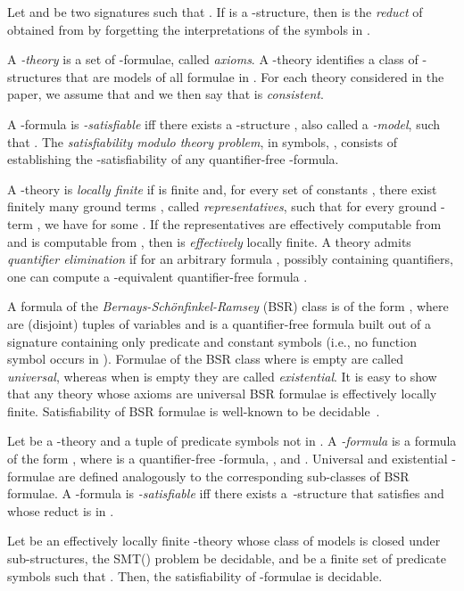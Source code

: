 \documentclass[conference]{llncs}
\begin{document}
{Let  and  be two
signatures such that . If  is a
-structure, then  is the \emph{reduct}
of  obtained from  by forgetting the
interpretations of the symbols in .

A \emph{-theory}  is a set of -formulae, called
\emph{axioms}. A -theory  identifies a class
 of -structures that are models of all
formulae in . For each theory  considered in the paper, we
assume that  and we then say that 
is \emph{consistent}. 

A -formula  is
\emph{-satisfiable} iff there exists a -structure
, also called a \emph{-model},
such that . The \emph{satisfiability modulo theory 
  problem}, in symbols, , consists of establishing
the -satisfiability of any quantifier-free -formula. 

A -theory  is \emph{locally finite} if  is finite
and, for every set of constants , there exist finitely
many ground terms , called
\emph{representatives}, such that for every ground -term , we have  for some . If
the representatives are effectively computable from 
and  is computable from , then  is \emph{effectively}
locally finite. 
A theory  admits \emph{quantifier elimination} if for an arbitrary formula ,
possibly containing quantifiers, one can compute a -equivalent
quantifier-free formula .

A formula of the \emph{Bernays-Sch{\"o}nfinkel-Ramsey} (BSR) class is of
the form , where  are (disjoint) tuples of variables and  is a
quantifier-free formula built out of a signature containing only
predicate and constant symbols (i.e., no function symbol occurs in
). Formulae of the BSR class where  is empty are
called \emph{universal}, whereas when  is empty they are
called \emph{existential}. It is easy to show that any theory whose
axioms are universal BSR formulae is effectively locally finite. Satisfiability of
BSR formulae is well-known to be decidable~\cite{ramsey}.

Let  be a -theory and  a tuple of predicate
symbols not in . A \emph{-formula} is a formula
of the form , where  is a
quantifier-free -formula,
, and . Universal and existential
-formulae are defined analogously to the corresponding
sub-classes of BSR formulae. A -formula  is
\emph{-satisfiable} iff there exists a
\,-structure  that satisfies 
and whose reduct  is in .

\begin{theorem}
  \label{th:dec-ext-BSR}
  Let  be an effectively locally finite -theory whose class of models is
  closed under sub-structures, the SMT() problem be decidable, and
   be a finite set of predicate symbols such that
  .  Then, the satisfiability
  of -formulae is decidable.
\end{theorem}

}
\end{document}
